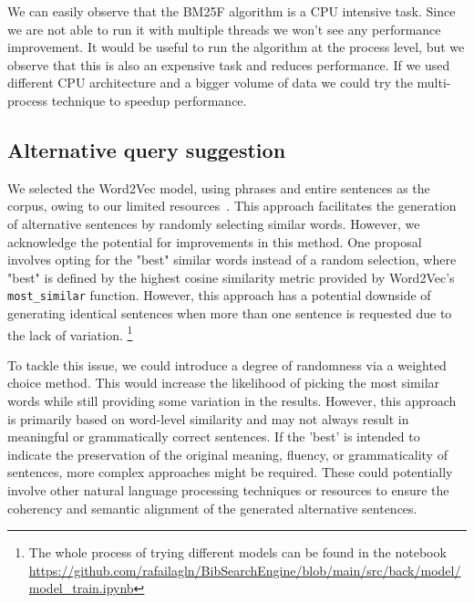 \documentclass{article}
\begin{document}
We can easily observe that the BM25F algorithm is a CPU intensive task. Since we are not able 
to run it with multiple threads we won't see any performance improvement. It would be useful 
to run the algorithm at the process level, but we observe that this is also an expensive task 
and reduces performance. If we used different CPU architecture and a bigger volume of data 
we could try the multi-process technique to speedup performance.

\subsection{Alternative query suggestion}

We selected the Word2Vec model, using phrases and entire sentences as the corpus, owing to our 
limited resources~. This approach facilitates the generation of alternative sentences by 
randomly selecting similar words. However, we acknowledge the potential for improvements in 
this method. One proposal involves opting for the "best" similar words instead of a random 
selection, where "best" is defined by the highest cosine similarity metric provided by 
Word2Vec's \texttt{most\_similar} function. However, this approach has a potential downside of 
generating identical sentences when more than one sentence is requested due to the lack of 
variation. \footnote{The whole process of trying different models can be found in the 
notebook \url{https://github.com/rafailagln/BibSearchEngine/blob/main/src/back/model/
model_train.ipynb}}



To tackle this issue, we could introduce a degree of randomness via a weighted choice method. 
This would increase the likelihood of picking the most similar words while still providing 
some variation in the results. However, this approach is primarily based on word-level 
similarity and may not always result in meaningful or grammatically correct sentences. If the 
'best' is intended to indicate the preservation of the original meaning, fluency, or 
grammaticality of sentences, more complex approaches might be required. These could 
potentially involve other natural language processing techniques or resources to ensure the 
coherency and semantic alignment of the generated alternative sentences.

\newpage



\newpage
\appendix
\end{document}
